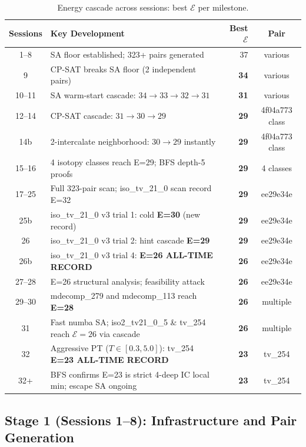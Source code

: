 \documentclass[11pt,a4paper]{article}
\theoremstyle{remark}
\newcommand{\E}{\mathcal{E}}
\begin{document}
\begin{table}[h]
\centering
\caption{Energy cascade across sessions: best $\E$ per milestone.}\label{tab:cascade}
\small
\begin{tabular}{clrc}
\toprule
Sessions & Key Development & Best $\E$ & Pair\\
\midrule
1--8   & SA floor established; 323+ pairs generated & 37 & various\\
9      & CP-SAT breaks SA floor (2 independent pairs) & \textbf{34} & various\\
10--11 & SA warm-start cascade: $34\to33\to32\to31$ & \textbf{31} & various\\
12--14 & CP-SAT cascade: $31\to30\to29$ & \textbf{29} & 4f04a773 class\\
14b    & 2-intercalate neighborhood: $30\to29$ instantly & \textbf{29} & 4f04a773 class\\
15--16 & 4 isotopy classes reach E=29; BFS depth-5 proofs & \textbf{29} & 4 classes\\
17--25 & Full 323-pair scan; iso\_tv\_21\_0 scan record E=32 & \textbf{29} & ee29e34e\\
25b    & iso\_tv\_21\_0 v3 trial 1: cold \textbf{E=30} (new record) & \textbf{29} & ee29e34e\\
26     & iso\_tv\_21\_0 v3 trial 2: hint cascade \textbf{E=29} & \textbf{29} & ee29e34e\\
26b    & iso\_tv\_21\_0 v3 trial 4: \textbf{E=26 ALL-TIME RECORD} & \textbf{26} & ee29e34e\\
27--28 & E=26 structural analysis; feasibility attack & \textbf{26} & ee29e34e\\
29--30 & mdecomp\_279 and mdecomp\_113 reach \textbf{E=28} & \textbf{26} & multiple\\
31     & Fast numba SA; iso2\_tv21\_0\_5 \& tv\_254 reach $\E=26$ via cascade & \textbf{26} & multiple\\
32     & Aggressive PT ($T\!\in\![0.3,5.0]$): tv\_254 \textbf{E=23 ALL-TIME RECORD} & \textbf{23} & tv\_254\\
32+    & BFS confirms E=23 is strict 4-deep IC local min; escape SA ongoing & \textbf{23} & tv\_254\\
\bottomrule
\end{tabular}
\end{table}

\subsection{Stage 1 (Sessions 1--8): Infrastructure and Pair Generation}
\end{document}
